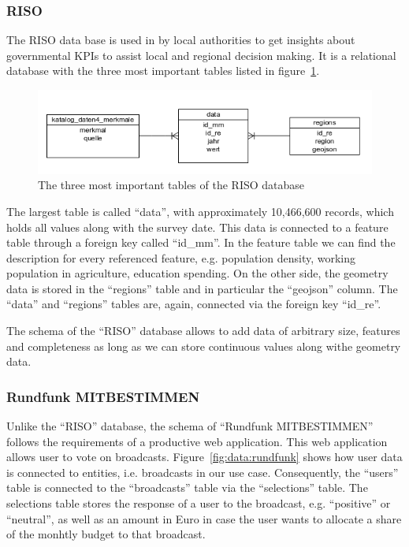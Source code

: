 \documentclass{article}
\begin{document}
\subsubsection{RISO}

The RISO data base is used in by local authorities to get insights about governmental KPIs to assist local and regional decision making.
It is a relational database with the three most important tables listed in figure~\ref{fig:data:riso}.
\begin{figure}[h]
\centering
  \includegraphics[width=\textwidth]{images/riso}
  \caption{The three most important tables of the RISO database}
  \label{fig:data:riso}
\end{figure}

The largest table is called ``data'', with approximately 10,466,600 records, which holds all values along with the survey date.
This data is connected to a feature table through a foreign key called ``id\_mm''.
In the feature table we can find the description for every referenced feature, e.g. population density, working population in agriculture, education spending.
On the other side, the geometry data is stored in the ``regions'' table and in particular the ``geojson'' column.
The ``data'' and ``regions'' tables are, again, connected via the foreign key ``id\_re''.

The schema of the ``RISO'' database allows to add data of arbitrary size, features and completeness as long as we can store continuous values along withe geometry data.


\subsubsection{Rundfunk MITBESTIMMEN}
Unlike the ``RISO'' database, the schema of ``Rundfunk MITBESTIMMEN'' follows the requirements of a productive web application.
This web application allows user to vote on broadcasts.
Figure~\ref{fig:data:rundfunk} shows how user data is connected to entities, i.e. broadcasts in our use case.
Consequently, the ``users'' table is connected to the ``broadcasts'' table via the ``selections'' table.
The selections table stores the response of a user to the broadcast, e.g. ``positive'' or ``neutral'', as well as an amount in Euro in case the user wants to allocate a share of the monhtly budget to that broadcast.
\end{document}
